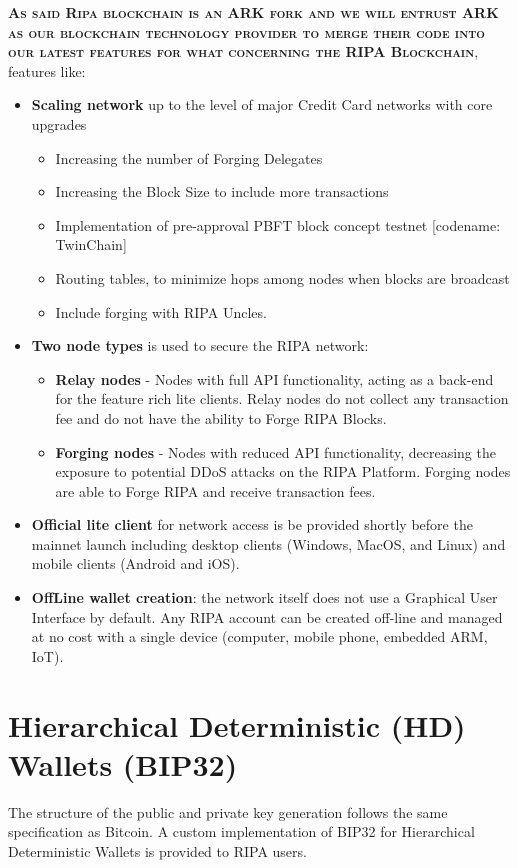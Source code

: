 \documentclass[11pt,fleqn]{book} %
\begin{document}
\vspace{5mm}
\textsc{\textbf{As said Ripa blockchain is an ARK fork and we will entrust ARK as our blockchain technology provider to merge their 
code into our latest features for what concerning the RIPA Blockchain}}, features like:
\begin{itemize}
	\item \textbf{Scaling network} up to the level of major Credit Card networks with core upgrades
	\begin{itemize}
		\item Increasing the number of Forging Delegates
		\item Increasing the Block Size to include more transactions
		\item Implementation of pre-approval PBFT block concept testnet [codename:
		TwinChain]
		\item Routing tables, to minimize hops among nodes when blocks are broadcast
		\item Include forging with RIPA Uncles.	
	\end{itemize}
	\item \textbf{Two node types} is used to secure the RIPA network:
	\begin{itemize}
		\item \textbf{Relay nodes} - Nodes with full API functionality, acting as a back-end for the
		feature rich lite clients. Relay nodes do not collect any transaction fee and do
		not have the ability to Forge RIPA Blocks.
		\item \textbf{Forging nodes} - Nodes with reduced API functionality, decreasing the
		exposure to potential DDoS attacks on the RIPA Platform. Forging nodes are
		able to Forge RIPA and receive transaction fees.
	\end{itemize}
	\item \textbf{Official lite client} for network access is be provided shortly before the mainnet
	launch including desktop clients (Windows, MacOS, and Linux) and mobile clients
	(Android and iOS).
	\item \textbf{OffLine wallet creation}: the network itself does not use a Graphical User Interface by default. Any RIPA
	account can be created off-line and managed at no cost with a single device
	(computer, mobile phone, embedded ARM, IoT).
\end{itemize}

\section{Hierarchical Deterministic (HD) Wallets (BIP32)}
The structure of the public and private key generation follows the same specification
as Bitcoin. A custom implementation of BIP32 for Hierarchical Deterministic Wallets
is provided to RIPA users.
\end{document}
